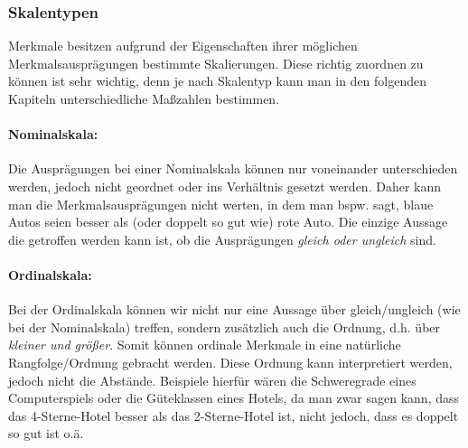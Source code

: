 \documentclass[a4paper]{article}
\begin{document}
\subsubsection{Skalentypen}\label{sec:Skalentypen}
Merkmale besitzen aufgrund der Eigenschaften ihrer m\"oglichen Merkmalsausprägungen bestimmte Skalierungen. Diese richtig zuordnen zu können ist sehr wichtig, denn je nach Skalentyp kann man in den folgenden Kapiteln unterschiedliche Maßzahlen bestimmen. 

\paragraph{Nominalskala:} Die Ausprägungen bei einer Nominalskala können nur voneinander unterschieden werden, jedoch nicht geordnet oder ins Verhältnis gesetzt werden. Daher kann man die Merkmalsausprägungen nicht werten, in dem man bspw. sagt, blaue Autos seien besser als (oder doppelt so gut wie) rote Auto. 
Die einzige Aussage die getroffen werden kann ist, ob die Ausprägungen \textit{gleich oder ungleich} sind.

\paragraph{Ordinalskala:} Bei der Ordinalskala können wir nicht nur eine Aussage über gleich/ungleich (wie bei der Nominalskala) treffen, sondern zusätzlich auch die Ordnung, d.h. über \textit{kleiner und größer}. Somit können ordinale Merkmale in eine natürliche Rangfolge/Ordnung gebracht werden. Diese Ordnung kann interpretiert werden, jedoch nicht die Abstände. Beispiele hierfür wären die Schweregrade eines Computerspiels oder die Güteklassen eines Hotels, da man zwar sagen kann, dass das 4-Sterne-Hotel besser als das 2-Sterne-Hotel ist, nicht jedoch, dass es doppelt so gut ist o.\"a. 
\end{document}
